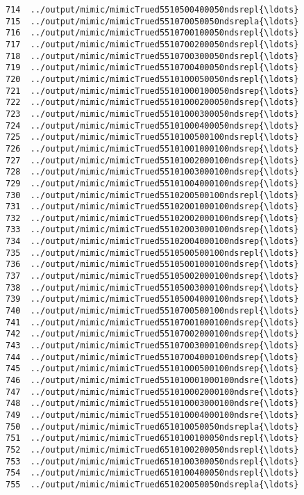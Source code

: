\documentclass[11pt]{article}
\begin{document}
\begin{Verbatim}[commandchars=\\\{\}]
714  ../output/mimic/mimicTrued5510500400050ndsrepl{\ldots}  
715  ../output/mimic/mimicTrued551070050050ndsrepla{\ldots}  
716  ../output/mimic/mimicTrued5510700100050ndsrepl{\ldots}  
717  ../output/mimic/mimicTrued5510700200050ndsrepl{\ldots}  
718  ../output/mimic/mimicTrued5510700300050ndsrepl{\ldots}  
719  ../output/mimic/mimicTrued5510700400050ndsrepl{\ldots}  
720  ../output/mimic/mimicTrued5510100050050ndsrepl{\ldots}  
721  ../output/mimic/mimicTrued55101000100050ndsrep{\ldots}  
722  ../output/mimic/mimicTrued55101000200050ndsrep{\ldots}  
723  ../output/mimic/mimicTrued55101000300050ndsrep{\ldots}  
724  ../output/mimic/mimicTrued55101000400050ndsrep{\ldots}  
725  ../output/mimic/mimicTrued5510100500100ndsrepl{\ldots}  
726  ../output/mimic/mimicTrued55101001000100ndsrep{\ldots}  
727  ../output/mimic/mimicTrued55101002000100ndsrep{\ldots}  
728  ../output/mimic/mimicTrued55101003000100ndsrep{\ldots}  
729  ../output/mimic/mimicTrued55101004000100ndsrep{\ldots}  
730  ../output/mimic/mimicTrued5510200500100ndsrepl{\ldots}  
731  ../output/mimic/mimicTrued55102001000100ndsrep{\ldots}  
732  ../output/mimic/mimicTrued55102002000100ndsrep{\ldots}  
733  ../output/mimic/mimicTrued55102003000100ndsrep{\ldots}  
734  ../output/mimic/mimicTrued55102004000100ndsrep{\ldots}  
735  ../output/mimic/mimicTrued5510500500100ndsrepl{\ldots}  
736  ../output/mimic/mimicTrued55105001000100ndsrep{\ldots}  
737  ../output/mimic/mimicTrued55105002000100ndsrep{\ldots}  
738  ../output/mimic/mimicTrued55105003000100ndsrep{\ldots}  
739  ../output/mimic/mimicTrued55105004000100ndsrep{\ldots}  
740  ../output/mimic/mimicTrued5510700500100ndsrepl{\ldots}  
741  ../output/mimic/mimicTrued55107001000100ndsrep{\ldots}  
742  ../output/mimic/mimicTrued55107002000100ndsrep{\ldots}  
743  ../output/mimic/mimicTrued55107003000100ndsrep{\ldots}  
744  ../output/mimic/mimicTrued55107004000100ndsrep{\ldots}  
745  ../output/mimic/mimicTrued55101000500100ndsrep{\ldots}  
746  ../output/mimic/mimicTrued551010001000100ndsre{\ldots}  
747  ../output/mimic/mimicTrued551010002000100ndsre{\ldots}  
748  ../output/mimic/mimicTrued551010003000100ndsre{\ldots}  
749  ../output/mimic/mimicTrued551010004000100ndsre{\ldots}  
750  ../output/mimic/mimicTrued651010050050ndsrepla{\ldots}  
751  ../output/mimic/mimicTrued6510100100050ndsrepl{\ldots}  
752  ../output/mimic/mimicTrued6510100200050ndsrepl{\ldots}  
753  ../output/mimic/mimicTrued6510100300050ndsrepl{\ldots}  
754  ../output/mimic/mimicTrued6510100400050ndsrepl{\ldots}  
755  ../output/mimic/mimicTrued651020050050ndsrepla{\ldots}  

\end{Verbatim}
\end{document}
